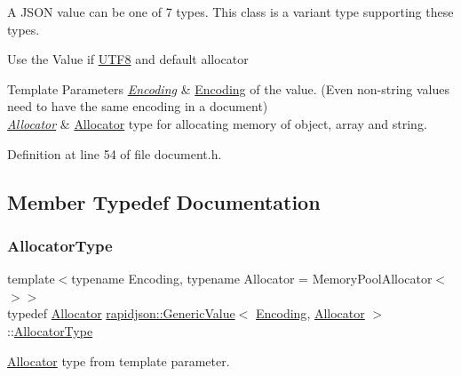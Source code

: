 A J\+S\+ON value can be one of 7 types. This class is a variant type supporting these types.

Use the Value if \mbox{\hyperlink{structrapidjson_1_1_u_t_f8}{U\+T\+F8}} and default allocator


\begin{DoxyTemplParams}{Template Parameters}
{\em \mbox{\hyperlink{classrapidjson_1_1_encoding}{Encoding}}} & \mbox{\hyperlink{classrapidjson_1_1_encoding}{Encoding}} of the value. (Even non-\/string values need to have the same encoding in a document) \\
\hline
{\em \mbox{\hyperlink{classrapidjson_1_1_allocator}{Allocator}}} & \mbox{\hyperlink{classrapidjson_1_1_allocator}{Allocator}} type for allocating memory of object, array and string. \\
\hline
\end{DoxyTemplParams}


Definition at line 54 of file document.\+h.



\subsection{Member Typedef Documentation}
\mbox{\label{classrapidjson_1_1_generic_value_a5d47340c96346c5028fee4c9068d783d}} 
\subsubsection{\texorpdfstring{AllocatorType}{AllocatorType}}
{\footnotesize\ttfamily template$<$typename Encoding, typename Allocator = Memory\+Pool\+Allocator$<$$>$$>$ \\
typedef \mbox{\hyperlink{classrapidjson_1_1_allocator}{Allocator}} \mbox{\hyperlink{classrapidjson_1_1_generic_value}{rapidjson\+::\+Generic\+Value}}$<$ \mbox{\hyperlink{classrapidjson_1_1_encoding}{Encoding}}, \mbox{\hyperlink{classrapidjson_1_1_allocator}{Allocator}} $>$\+::\mbox{\hyperlink{classrapidjson_1_1_generic_value_a5d47340c96346c5028fee4c9068d783d}{Allocator\+Type}}}



\mbox{\hyperlink{classrapidjson_1_1_allocator}{Allocator}} type from template parameter. 



